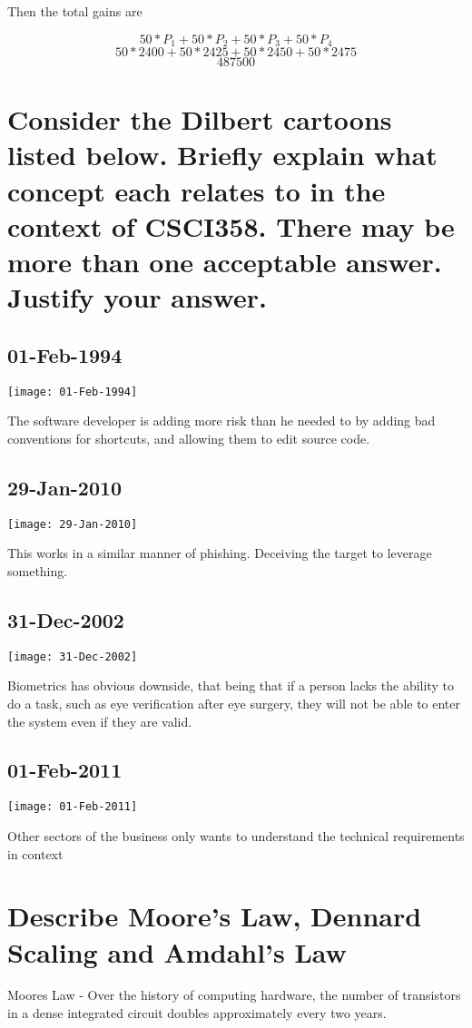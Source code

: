 \documentclass{article}
\begin{document}
Then the total gains are

\[50*P_1 + 50*P_2 + 50*P_3 + 50*P_4\]
\[50*2400 + 50*2425 + 50*2450 + 50*2475\]
\[487500\]


\section[Dilbert]{Consider the Dilbert cartoons listed below. Briefly explain what concept each relates to in the
context of CSCI358. There may be more than one acceptable answer. Justify your answer.}
\subsection{01-Feb-1994}
\texttt{[image: 01-Feb-1994]}

The software developer is adding more risk than he needed to by adding bad conventions for shortcuts, and allowing them to edit source code. 
\subsection{29-Jan-2010}
\texttt{[image: 29-Jan-2010]}

This works in a similar manner of phishing. Deceiving the target to leverage something. 
\subsection{31-Dec-2002}
\texttt{[image: 31-Dec-2002]}

Biometrics has obvious downside, that being that if a person lacks the ability to do a task, such as eye verification after eye surgery, they will not be able to enter the system even if they are valid. 
\subsection{01-Feb-2011}
\texttt{[image: 01-Feb-2011]}

Other sectors of the business only wants to understand the technical requirements in context 
\section[Laws]{Describe Moore’s Law, Dennard Scaling and Amdahl’s Law}

Moores Law -  Over the history of computing hardware, the number of transistors in a dense integrated circuit doubles approximately every two years. \cite{moores}
\end{document}
